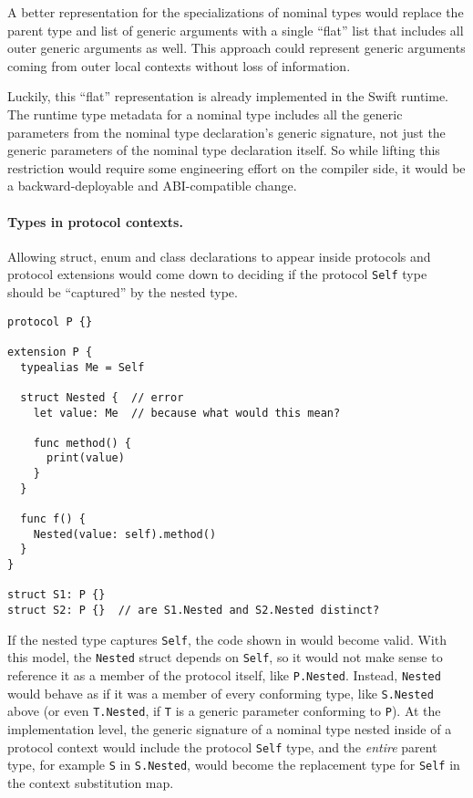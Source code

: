 \documentclass[../generics]{subfiles}
\begin{document}
A better representation for the specializations of nominal types would replace the parent type and list of generic arguments with a single ``flat'' list that includes all outer generic arguments as well. This approach could represent generic arguments coming from outer local contexts without loss of information.

Luckily, this ``flat'' representation is already implemented in the Swift runtime. The runtime type metadata for a nominal type includes all the generic parameters from the nominal type declaration's generic signature, not just the generic parameters of the nominal type declaration itself. So while lifting this restriction would require some engineering effort on the compiler side, it would be a backward-deployable and ABI-compatible change.

\paragraph{Types in protocol contexts.} Allowing struct, enum and class declarations to appear inside protocols and protocol extensions would come down to deciding if the protocol \texttt{Self} type should be ``captured'' by the nested type.

\begin{listing}\label{nominal type in protocol context}
\begin{Verbatim}
protocol P {}

extension P {
  typealias Me = Self

  struct Nested {  // error
    let value: Me  // because what would this mean?

    func method() {
      print(value)
    }
  }
  
  func f() {
    Nested(value: self).method()
  }
}

struct S1: P {}
struct S2: P {}  // are S1.Nested and S2.Nested distinct?
\end{Verbatim}
\end{listing}
If the nested type captures \texttt{Self}, the code shown in  would become valid. With this model, the \texttt{Nested} struct depends on \texttt{Self}, so it would not make sense to reference it as a member of the protocol itself, like \texttt{P.Nested}. Instead, \texttt{Nested} would behave as if it was a member of every conforming type, like \texttt{S.Nested} above (or even \texttt{T.Nested}, if \texttt{T} is a generic parameter conforming to \texttt{P}). At the implementation level, the generic signature of a nominal type nested inside of a protocol context would include the protocol \texttt{Self} type, and the \emph{entire} parent type, for example \texttt{S} in \texttt{S.Nested}, would become the replacement type for \texttt{Self} in the context substitution map.
\end{document}
